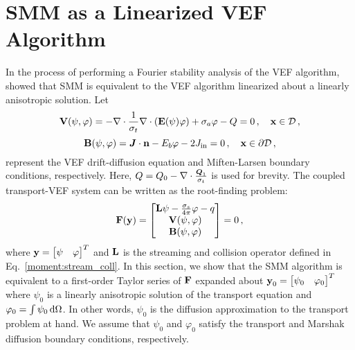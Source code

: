 \documentclass[../doc.tex]{subfiles}
\begin{document}
\section{SMM as a Linearized VEF Algorithm} \label{moment_sec:linearize}
In the process of performing a Fourier stability analysis of the VEF algorithm, \textcite{cefus} showed that SMM is equivalent to the VEF algorithm linearized about a linearly anisotropic solution. Let 
	\begin{equation}
		\boldsymbol{\mathrm{V}}(\psi,\varphi) = -\nabla\cdot\frac{1}{\sigma_t}\nabla\cdot\left( \boldsymbol{\mathrm{E}}(\psi)\varphi \right) + \sigma_a \varphi - Q = 0 \,, \quad \boldsymbol{\mathrm{x}} \in \mathcal{D} \,,
	\end{equation}
	\begin{equation}
		\boldsymbol{\mathrm{B}}(\psi,\varphi) = \boldsymbol{J}\cdot\boldsymbol{\mathrm{n}} - E_b \varphi - 2J_\text{in} = 0 \,, \quad \boldsymbol{\mathrm{x}} \in \partial\mathcal{D} \,,
	\end{equation}
represent the VEF drift-diffusion equation and Miften-Larsen boundary conditions, respectively. Here, $Q = Q_0 - \nabla\cdot\frac{\boldsymbol{Q}_1}{\sigma_t}$ is used for brevity. The coupled transport-VEF system can be written as the root-finding problem: 
	\begin{equation} \label{moment:vef_root}
		\boldsymbol{\mathrm{F}}(\boldsymbol{\mathrm{y}}) = \begin{bmatrix} 
			\boldsymbol{\mathrm{L}}\psi - \frac{\sigma_s}{4\pi}\varphi - q \\ 
			\boldsymbol{\mathrm{V}}(\psi,\varphi) \\ 
			\boldsymbol{\mathrm{B}}(\psi,\varphi)
		\end{bmatrix}
		= 0 \,, 
	\end{equation}
where $\boldsymbol{\mathrm{y}} = \begin{bmatrix} \psi & \varphi \end{bmatrix}^T$ and $\boldsymbol{\mathrm{L}}$ is the streaming and collision operator defined in Eq.~\ref{moment:stream_coll}. In this section, we show that the SMM algorithm is equivalent to a first-order Taylor series of $\boldsymbol{\mathrm{F}}$ expanded about $\boldsymbol{\mathrm{y}}_0 = \begin{bmatrix} \psi_0 & \varphi_0 \end{bmatrix}^T$ where $\psi_0$ is a linearly anisotropic solution of the transport equation and $\varphi_0 = \int \psi_0 \mathop{}\!\mathrm{d} \Omega$. In other words, $\psi_0$ is the diffusion approximation to the transport problem at hand. We assume that $\psi_0$ and $\varphi_0$ satisfy the transport and Marshak diffusion boundary conditions, respectively. 
\end{document}
